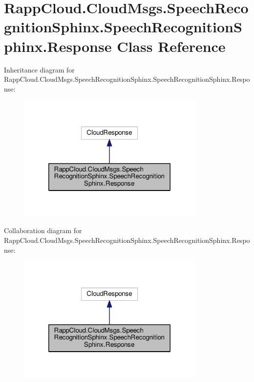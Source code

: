 \hypertarget{classRappCloud_1_1CloudMsgs_1_1SpeechRecognitionSphinx_1_1SpeechRecognitionSphinx_1_1Response}{\section{Rapp\-Cloud.\-Cloud\-Msgs.\-Speech\-Recognition\-Sphinx.\-Speech\-Recognition\-Sphinx.\-Response Class Reference}
\label{classRappCloud_1_1CloudMsgs_1_1SpeechRecognitionSphinx_1_1SpeechRecognitionSphinx_1_1Response}
}


Inheritance diagram for Rapp\-Cloud.\-Cloud\-Msgs.\-Speech\-Recognition\-Sphinx.\-Speech\-Recognition\-Sphinx.\-Response\-:
\nopagebreak
\begin{figure}[H]
\begin{center}
\leavevmode
\includegraphics[width=264pt]{classRappCloud_1_1CloudMsgs_1_1SpeechRecognitionSphinx_1_1SpeechRecognitionSphinx_1_1Response__inherit__graph}
\end{center}
\end{figure}


Collaboration diagram for Rapp\-Cloud.\-Cloud\-Msgs.\-Speech\-Recognition\-Sphinx.\-Speech\-Recognition\-Sphinx.\-Response\-:
\nopagebreak
\begin{figure}[H]
\begin{center}
\leavevmode
\includegraphics[width=264pt]{classRappCloud_1_1CloudMsgs_1_1SpeechRecognitionSphinx_1_1SpeechRecognitionSphinx_1_1Response__coll__graph}
\end{center}
\end{figure}
